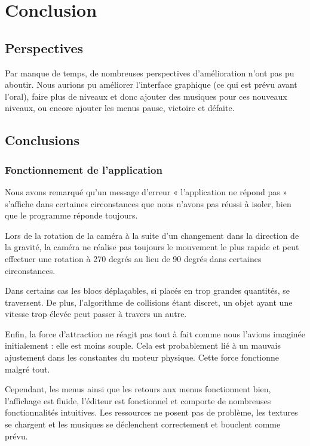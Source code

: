 \chapter{Conclusion}

\section{Perspectives}
Par manque de temps, de nombreuses perspectives d'amélioration n'ont pas pu
aboutir. Nous aurions pu améliorer l'interface graphique (ce qui est prévu
avant l'oral), faire plus de niveaux et donc ajouter des musiques pour ces
nouveaux niveaux, ou encore ajouter les menus pause, victoire et défaite.

\section{Conclusions}

\subsection{Fonctionnement de l'application}

Nous avons remarqué qu'un message d'erreur « l'application ne répond pas »
s'affiche dans certaines circonstances que nous n'avons pas réussi à isoler,
bien que le programme réponde toujours.

Lors de la rotation de la caméra à la suite d'un changement dans la direction
de la gravité, la caméra ne réalise pas toujours le mouvement le plus rapide
et peut effectuer une rotation à 270 degrés au lieu de 90 degrés dans certaines
circonstances.

Dans certains cas les blocs déplaçables, si placés en trop grandes quantités,
se traversent. De plus, l'algorithme de collisions étant discret, un objet
ayant une vitesse trop élevée peut passer à travers un autre.

Enfin, la force d'attraction ne réagit pas tout à fait comme nous l'avions
imaginée initialement : elle est moins souple. Cela est probablement lié
à un mauvais ajustement dans les constantes du moteur physique. Cette
force fonctionne malgré tout.

Cependant, les menus ainsi que les retours aux menus fonctionnent bien,
l'affichage est fluide, l'éditeur est fonctionnel et comporte de nombreuses
fonctionnalités intuitives. Les ressources ne posent pas de problème,
les textures se chargent et les musiques se déclenchent correctement
et bouclent comme prévu.

